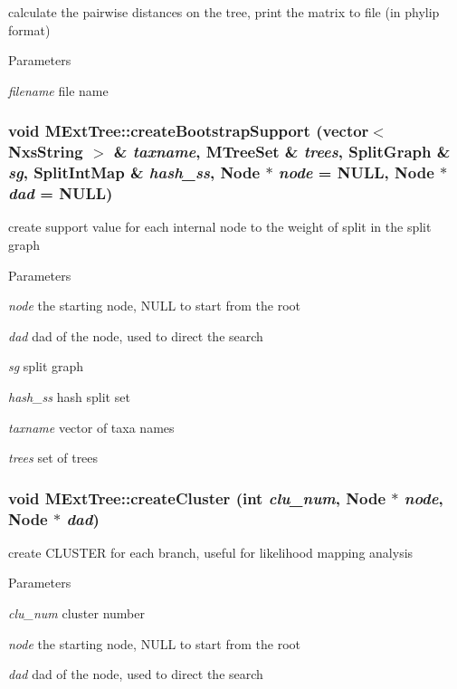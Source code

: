 \label{classMExtTree_ab89f62be12aaaf2b63ddbef4e8750b38}
calculate the pairwise distances on the tree, print the matrix to file (in phylip format) 
\begin{DoxyParams}{Parameters}
\item[{\em filename}]file name \end{DoxyParams}
\hypertarget{classMExtTree_ae1336390c977f7de6153ca2b06e9fbe1}{
\subsubsection[{createBootstrapSupport}]{\setlength{\rightskip}{0pt plus 5cm}void MExtTree::createBootstrapSupport (vector$<$ {\bf NxsString} $>$ \& {\em taxname}, \/  {\bf MTreeSet} \& {\em trees}, \/  {\bf SplitGraph} \& {\em sg}, \/  {\bf SplitIntMap} \& {\em hash\_\-ss}, \/  {\bf Node} $\ast$ {\em node} = {\ttfamily NULL}, \/  {\bf Node} $\ast$ {\em dad} = {\ttfamily NULL})}}
\label{classMExtTree_ae1336390c977f7de6153ca2b06e9fbe1}
create support value for each internal node to the weight of split in the split graph 
\begin{DoxyParams}{Parameters}
\item[{\em node}]the starting node, NULL to start from the root \item[{\em dad}]dad of the node, used to direct the search \item[{\em sg}]split graph \item[{\em hash\_\-ss}]hash split set \item[{\em taxname}]vector of taxa names \item[{\em trees}]set of trees \end{DoxyParams}
\hypertarget{classMExtTree_a658a3e1db727b23b7ce67754347230f5}{
\subsubsection[{createCluster}]{\setlength{\rightskip}{0pt plus 5cm}void MExtTree::createCluster (int {\em clu\_\-num}, \/  {\bf Node} $\ast$ {\em node}, \/  {\bf Node} $\ast$ {\em dad})}}
\label{classMExtTree_a658a3e1db727b23b7ce67754347230f5}
create CLUSTER for each branch, useful for likelihood mapping analysis 
\begin{DoxyParams}{Parameters}
\item[{\em clu\_\-num}]cluster number \item[{\em node}]the starting node, NULL to start from the root \item[{\em dad}]dad of the node, used to direct the search \end{DoxyParams}
